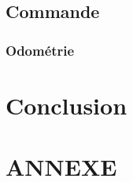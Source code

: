 \documentclass[10pt,a4paper]{article}
\begin{document}
\subsection{Commande}
\label{sec:commande}

\subsubsection{Odométrie}

\newpage
\section{Conclusion}
\label{sec:conclusion}

\newpage
\listoffigures
\newpage

\section*{ANNEXE}
\end{document}
